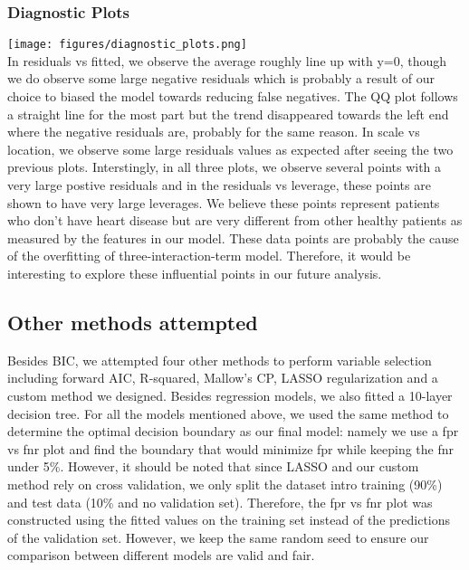 \documentclass{article}
\begin{document}
\subsubsection{Diagnostic Plots}

\texttt{[image: figures/diagnostic\_plots.png]}\\

In residuals vs fitted, we observe the average roughly line up with y=0,
though we do observe some large negative residuals which is probably a
result of our choice to biased the model towards reducing false negatives.
The QQ plot follows a straight line for the most part but the trend disappeared
towards the left end where the negative residuals are, probably for the same
reason. In scale vs location, we observe some large residuals values as expected
after seeing the two previous plots. Interstingly, in all three plots, we observe
several points with a very large postive residuals and in the residuals vs leverage,
these points are shown to have very large leverages. We believe these points
represent patients who don't have heart disease but are very different from
other healthy patients as measured by the features in our model. These data
points are probably the cause of the overfitting of three-interaction-term model.
Therefore, it would be interesting to explore these influential points in our
future analysis.

\subsection{Other methods attempted}
Besides BIC, we attempted four other methods to perform variable selection
including forward AIC, R-squared, Mallow's CP, LASSO regularization and a custom
method we designed. Besides regression models, we also fitted a 10-layer decision
tree. For all the models mentioned above, we used the same method to determine
the optimal decision boundary as our final model: namely we use a fpr vs fnr
plot and find the boundary that would minimize fpr while keeping the fnr under
5\%. However, it should be noted that since LASSO and our custom method rely on
cross validation, we only split the dataset intro training (90\%) and test data
(10\% and no validation set). Therefore, the fpr vs fnr plot was constructed
using the fitted values on the training set instead of the predictions of the
validation set. However, we keep the same random seed to ensure our comparison
between different models are valid and fair.
\end{document}
